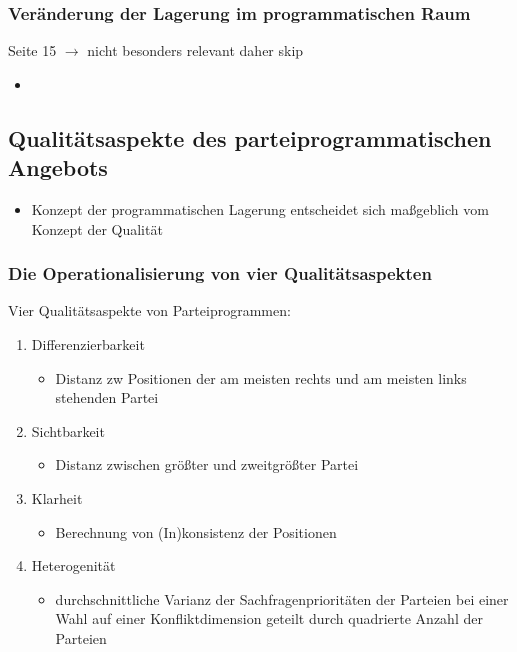 \documentclass[11pt]{article}
\begin{document}
\subsubsection{Veränderung der Lagerung im programmatischen Raum}
\label{sec:org1c97ff2}
Seite 15 \(\rightarrow\) nicht besonders relevant daher skip 

\begin{itemize}
\item 
\end{itemize}

\subsection{Qualitätsaspekte des parteiprogrammatischen Angebots}
\label{sec:org2860b47}
\begin{itemize}
\item Konzept der programmatischen Lagerung entscheidet sich maßgeblich vom Konzept der Qualität
\end{itemize}

\subsubsection{Die Operationalisierung von vier Qualitätsaspekten}
\label{sec:orgb1be80f}
Vier Qualitätsaspekte von Parteiprogrammen:
\begin{enumerate}
\item Differenzierbarkeit
\begin{itemize}
\item Distanz zw Positionen der am meisten rechts und am meisten links stehenden Partei
\end{itemize}
\item Sichtbarkeit
\begin{itemize}
\item Distanz zwischen größter und zweitgrößter Partei
\end{itemize}
\item Klarheit
\begin{itemize}
\item Berechnung von (In)konsistenz der Positionen
\end{itemize}
\item Heterogenität
\begin{itemize}
\item durchschnittliche Varianz der Sachfragenprioritäten der Parteien bei einer Wahl auf einer Konfliktdimension geteilt durch quadrierte Anzahl der Parteien
\end{itemize}
\end{enumerate}
\end{document}
